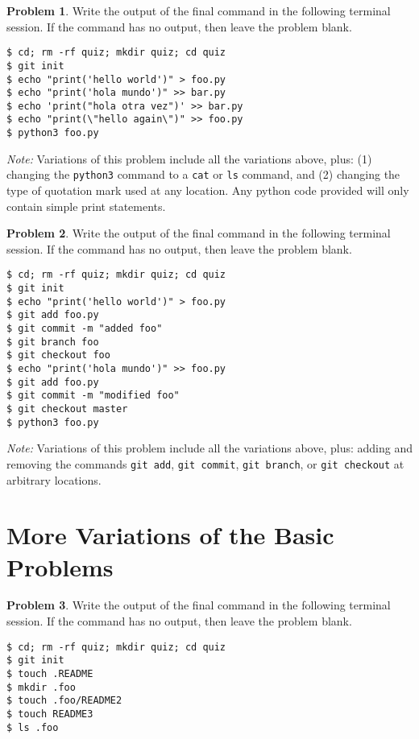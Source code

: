\documentclass[10pt]{article}
\theoremstyle{definition}
\newtheorem{problem}{Problem}
\begin{document}
\begin{problem}
    Write the output of the final command in the following terminal session.
    If the command has no output, then leave the problem blank.
\end{problem}
\begin{lstlisting}
$ cd; rm -rf quiz; mkdir quiz; cd quiz
$ git init
$ echo "print('hello world')" > foo.py
$ echo "print('hola mundo')" >> bar.py
$ echo 'print("hola otra vez")' >> bar.py
$ echo "print(\"hello again\")" >> foo.py
$ python3 foo.py
\end{lstlisting}
\textit{Note:}
Variations of this problem include all the variations above,
plus:
(1) changing the \lstinline{python3} command to a \lstinline{cat} or \lstinline{ls} command,
and (2) changing the type of quotation mark used at any location.
Any python code provided will only contain simple print statements.
\vspace{2in}

\begin{problem}
    Write the output of the final command in the following terminal session.
    If the command has no output, then leave the problem blank.
\end{problem}
\begin{lstlisting}
$ cd; rm -rf quiz; mkdir quiz; cd quiz
$ git init
$ echo "print('hello world')" > foo.py
$ git add foo.py
$ git commit -m "added foo"
$ git branch foo
$ git checkout foo
$ echo "print('hola mundo')" >> foo.py
$ git add foo.py
$ git commit -m "modified foo"
$ git checkout master
$ python3 foo.py
\end{lstlisting}
\textit{Note:}
Variations of this problem include all the variations above,
plus:
adding and removing the commands \lstinline{git add}, \lstinline{git commit}, \lstinline{git branch}, or \lstinline{git checkout} at arbitrary locations.

\section{More Variations of the Basic Problems}

\begin{problem}
    Write the output of the final command in the following terminal session.
    If the command has no output, then leave the problem blank.
\end{problem}
\begin{lstlisting}
$ cd; rm -rf quiz; mkdir quiz; cd quiz
$ git init
$ touch .README
$ mkdir .foo
$ touch .foo/README2
$ touch README3
$ ls .foo
\end{lstlisting}
\vspace{1in}
\end{document}
